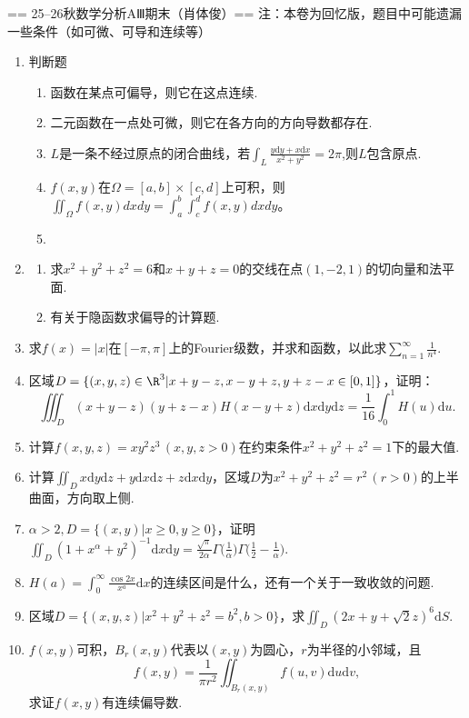 == 25--26秋数学分析AⅢ期末（肖体俊）==
注：本卷为回忆版，题目中可能遗漏一些条件（如可微、可导和连续等）
\begin{enumerate}
    \item 判断题
    \begin{enumerate}[label=(\arabic*)]
        \item 函数在某点可偏导，则它在这点连续.
        \item 二元函数在一点处可微，则它在各方向的方向导数都存在.
        \item $L$是一条不经过原点的闭合曲线，若$\displaystyle\int_{L}\frac{y\text{d}y+x\text{d}x}{x^2+y^2}=2\pi$,则$L$包含原点.
        \item $f(x,y)$在$\Omega=[a,b]\times[c,d]$上可积，则$\displaystyle\iint_{\Omega}f(x,y)dxdy=\int_{a}^b\int_{c}^df(x,y)dxdy$。
        \item 
    \end{enumerate}
    \item \begin{enumerate}[label=(\arabic*)]
        \item 求$x^2+y^2+z^2=6$和$x+y+z=0$的交线在点$(1,-2,1)$的切向量和法平面.
        \item 有关于隐函数求偏导的计算题.
    \end{enumerate}
    \item 求$f(x)=|x|$在$[-\pi,\pi]$上的Fourier级数，并求和函数，以此求$\displaystyle\sum_{n=1}^\infty \frac{1}{n^4}$.
    \item 区域$D=\{(x,y,z)\in\R^3|x+y-z,x-y+z,y+z-x\in[0,1]\}$，证明：
    \[\iiint_{D}(x+y-z)(y+z-x)H(x-y+z)\text{d}x\text{d}y\text{d}z=\frac{1}{16}\int_{0}^1H(u)\text{d}u.\]
    \item 计算$f(x,y,z)=xy^2z^3\,(x,y,z>0)$在约束条件$x^2+y^2+z^2=1$下的最大值.
    \item 计算$\displaystyle\iint_{D}x\text{d}y\text{d}z+y\text{d}x\text{d}z+z\text{d}x\text{d}y$，区域$D$为$x^2+y^2+z^2=r^2\,(r>0)$的上半曲面，方向取上侧.
    \item $\alpha>2,D=\{(x,y)|x\geqslant0,y\geqslant0\}$，证明$\displaystyle\iint_{D}(1+x^{\alpha}+y^2)^{-1}\text{d}x\text{d}y=\frac{\sqrt{\pi}}{2\alpha}\Gamma\Big(\frac{1}{\alpha}\Big)\Gamma\Big(\frac{1}{2}-\frac{1}{\alpha}\Big)$.
    \item $\displaystyle H(a)=\int_{0}^{\infty}\frac{\cos 2x}{x^a}\text{d}x$的连续区间是什么，还有一个关于一致收敛的问题.
    \item 区域$D=\{(x,y,z)|x^2+y^2+z^2=b^2,b>0\}$，求$\displaystyle\iint_{D}(2x+y+\sqrt{2}z)^6\text{d}S$.
    \item $f(x,y)$可积，$B_r(x,y)$代表以$(x,y)$为圆心，$r$为半径的小邻域，且
    $$f(x,y)=\frac{1}{\pi r^2}\iint_{B_r(x,y)}f(u,v)\text{d}u\text{d}v,$$
    求证$f(x,y)$有连续偏导数.
\end{enumerate}


